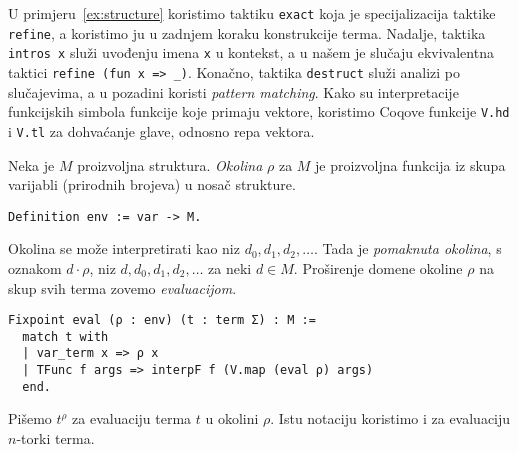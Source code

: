 \begin{remark}
  U primjeru~\ref{ex:structure} koristimo taktiku \texttt{exact} koja je specijalizacija taktike \texttt{refine},
  a koristimo ju u zadnjem koraku konstrukcije terma.
  Nadalje, taktika \texttt{intros x} služi uvođenju imena \texttt{x} u kontekst,
  a u našem je slučaju ekvivalentna taktici \texttt{refine (fun x => \_)}.
  Konačno, taktika \texttt{destruct} služi analizi po slučajevima, a u pozadini koristi \textit{pattern matching}.
  Kako su interpretacije funkcijskih simbola funkcije koje primaju vektore,
  koristimo Coqove funkcije \texttt{V.hd} i \texttt{V.tl} za dohvaćanje glave, odnosno repa vektora.
\end{remark}


\begin{definition}
  Neka je \(M\) proizvoljna struktura. \textit{Okolina} \(\rho\) za \(M\) je proizvoljna funkcija iz skupa varijabli (prirodnih brojeva) u nosač strukture.
\begin{verbatim}
Definition env := var -> M.
\end{verbatim}
  \noindent Okolina se može interpretirati kao niz \(d_{0}, d_{1}, d_{2}, \ldots\). Tada je \textit{pomaknuta okolina}, s oznakom \(d \cdot \rho\),
  niz \(d, d_{0}, d_{1}, d_{2}, \ldots\) za neki \(d \in M\).
  \noindent Proširenje domene okoline \(\rho\) na skup svih terma zovemo \textit{evaluacijom}.
\begin{verbatim}
Fixpoint eval (ρ : env) (t : term Σ) : M :=
  match t with
  | var_term x => ρ x
  | TFunc f args => interpF f (V.map (eval ρ) args)
  end.
\end{verbatim}
  Pišemo \(t^{\rho}\) za evaluaciju terma \(t\) u okolini \(\rho\).
  Istu notaciju koristimo i za evaluaciju \(n\)-torki terma.
\end{definition}

